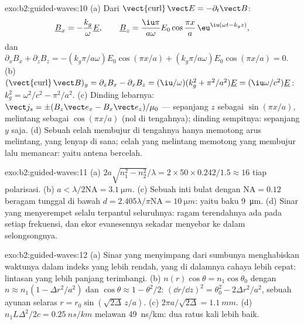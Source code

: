 \begin{solution}{exo:b2:guided-waves:10}
(a) Dari $\operatorname{\vect{curl}}\vect E = -\partial_t\vect B$:
\[
\underline B_x = -\frac{k_g}\omega\underline E , \qquad
\underline B_z = \frac{\iu\pi}{a\omega}E_0\cos\frac{\pi x}a\,\eu^{\iu(\omega t - k_gz)} ,
\]
dan $\partial_xB_x + \partial_zB_z = -(k_g\pi/a\omega)E_0\cos(\pi x/a) + (k_g\pi/a\omega)E_0
\cos(\pi x/a) = 0$. (b) $(\operatorname{\vect{curl}}\vect B)_y = \partial_zB_x - \partial_xB_z =
(\iu/\omega)(k_g^2 + \pi^2/a^2)\underline E = (\iu\omega/c^2)\underline E$: $k_g^2 = \omega^2/c^2 - \pi^2/a^2$.
(c) Dinding lebarnya: $\vect j_s = \pm(B_z\vect e_x - B_x\vect e_z)/\mu_0$ --- sepanjang $z$
sebagai $\sin(\pi x/a)$, melintang sebagai $\cos(\pi x/a)$ (nol di tengahnya); dinding
sempitnya: sepanjang $y$ saja. (d) Sebuah celah membujur di tengahnya hanya memotong
arus melintang, yang lenyap di sana; celah yang melintang memotong
yang membujur lalu memancar: yaitu antena  bercelah.
\end{solution}

\begin{solution}{exo:b2:guided-waves:11}
(a) $2a\sqrt{n_1^2 - n_2^2}/\lambda = 2 \times 50 \times 0.242/1.5 \approx 16$ tiap polarisasi.
(b) $a < \lambda/2\mathrm{NA} = \qty{3.1}{\micro m}$. (c) Sebuah inti bulat dengan $\mathrm{NA} =
0.12$ beragam tunggal di bawah $d = 2.405\lambda/\pi\mathrm{NA} = \qty{10}{\micro m}$: yaitu
baku \qty{9}{\micro m}. (d) Sinar yang menyerempet selalu terpantul seluruhnya:
ragam terendahnya ada pada setiap frekuensi, dan ekor evanesennya sekadar
menyebar ke dalam selongsongnya.
\end{solution}

\begin{solution}{exo:b2:guided-waves:12}
(a) Sinar yang menyimpang dari sumbunya menghabiskan waktunya dalam indeks yang lebih rendah, yang di dalamnya cahaya
lebih cepat: lintasan yang lebih panjang terimbangi. (b) $n(r)\cos\theta = n_1\cos\theta_0$
dengan $n \approx n_1(1 - \Delta r^2/a^2)$ dan $\cos\theta \approx 1 - \theta^2/2$: $(\dd r/\dd z)^2 =
\theta_0^2 - 2\Delta r^2/a^2$, sebuah ayunan selaras $r = r_0\sin(\sqrt{2\Delta}\,z/a)$.
(c) $2\pi a/\sqrt{2\Delta} = \qty{1.1}{mm}$. (d) $n_1L\Delta^2/2c = \qty{0.25}{ns/km}$ melawan
\qty{49}{ns/km}: dua ratus kali lebih baik.
\end{solution}

